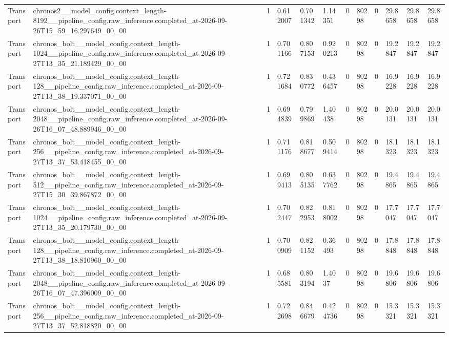\begin{tabular}{llllllllllll}
Transport & chronos2\_\_model\_config.context\_length-8192\_\_pipeline\_config.raw\_inference.completed\_at-2026-09-26T15\_59\_16.297649\_00\_00 & 1 & 0.612007 & 0.701342 & 1.14351 & 0 & 80298 & 0 & 29.8658 & 29.8658 & 29.8658 \\
Transport & chronos\_bolt\_\_model\_config.context\_length-1024\_\_pipeline\_config.raw\_inference.completed\_at-2026-09-27T13\_35\_21.189429\_00\_00 & 1 & 0.701166 & 0.807153 & 0.920213 & 0 & 80298 & 0 & 19.2847 & 19.2847 & 19.2847 \\
Transport & chronos\_bolt\_\_model\_config.context\_length-128\_\_pipeline\_config.raw\_inference.completed\_at-2026-09-27T13\_38\_19.337071\_00\_00 & 1 & 0.721684 & 0.830772 & 0.436457 & 0 & 80298 & 0 & 16.9228 & 16.9228 & 16.9228 \\
Transport & chronos\_bolt\_\_model\_config.context\_length-2048\_\_pipeline\_config.raw\_inference.completed\_at-2026-09-26T16\_07\_48.889946\_00\_00 & 1 & 0.694839 & 0.799869 & 1.40438 & 0 & 80298 & 0 & 20.0131 & 20.0131 & 20.0131 \\
Transport & chronos\_bolt\_\_model\_config.context\_length-256\_\_pipeline\_config.raw\_inference.completed\_at-2026-09-27T13\_37\_53.418455\_00\_00 & 1 & 0.711176 & 0.818677 & 0.509414 & 0 & 80298 & 0 & 18.1323 & 18.1323 & 18.1323 \\
Transport & chronos\_bolt\_\_model\_config.context\_length-512\_\_pipeline\_config.raw\_inference.completed\_at-2026-09-27T15\_30\_39.867872\_00\_00 & 1 & 0.699413 & 0.805135 & 0.637762 & 0 & 80298 & 0 & 19.4865 & 19.4865 & 19.4865 \\
Transport & chronos\_bolt\_\_model\_config.context\_length-1024\_\_pipeline\_config.raw\_inference.completed\_at-2026-09-27T13\_35\_20.179730\_00\_00 & 1 & 0.702447 & 0.822953 & 0.818002 & 0 & 80298 & 0 & 17.7047 & 17.7047 & 17.7047 \\
Transport & chronos\_bolt\_\_model\_config.context\_length-128\_\_pipeline\_config.raw\_inference.completed\_at-2026-09-27T13\_38\_18.810960\_00\_00 & 1 & 0.700909 & 0.821152 & 0.36493 & 0 & 80298 & 0 & 17.8848 & 17.8848 & 17.8848 \\
Transport & chronos\_bolt\_\_model\_config.context\_length-2048\_\_pipeline\_config.raw\_inference.completed\_at-2026-09-26T16\_07\_47.396009\_00\_00 & 1 & 0.685581 & 0.803194 & 1.4037 & 0 & 80298 & 0 & 19.6806 & 19.6806 & 19.6806 \\
Transport & chronos\_bolt\_\_model\_config.context\_length-256\_\_pipeline\_config.raw\_inference.completed\_at-2026-09-27T13\_37\_52.818820\_00\_00 & 1 & 0.722698 & 0.846679 & 0.424736 & 0 & 80298 & 0 & 15.3321 & 15.3321 & 15.3321 \\

\end{tabular}
